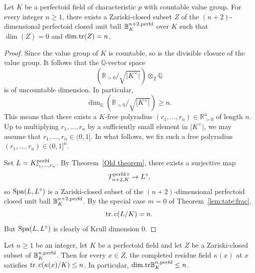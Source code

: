 \begin{thm}\label{Main theorem 2}Let $K$ be a perfectoid field of characteristic $p$ with countable value group. For every integer $n\geq1$, there exists a Zariski-closed subset $Z$ of the $(n+2)$-dimensional perfectoid closed unit ball $\mathbb{B}_{K}^{n+2,\operatorname{perfd}}$ over $K$ such that $\dim(Z)=0$ and $\mathrm{dim.tr}(Z)=n$.\end{thm}
\begin{proof}
Since the value group of $K$ is countable, so is the divisible closure of the value group. It follows that the $\mathbb{Q}$-vector space \begin{equation*}(\mathbb{R}_{>0}/\sqrt{\vert K^{\times}\vert})\otimes_{\mathbb{Z}}\mathbb{Q} \end{equation*}is of uncountable dimension. In particular, \begin{equation*}\dim_{\mathbb{Q}}(\mathbb{R}_{>0}/\sqrt{\vert K^{\times}\vert})\geq n.\end{equation*}This means that there exists a $K$-free polyradius $(r_1,\dots, r_n)\in \mathbb{R}_{>0}^{n}$ of length $n$. Up to multiplying $r_1,\dots, r_n$ by a sufficiently small element in $\vert K^{\times}\vert$, we may assume that $r_1,\dots, r_n\in (0, 1]$. In what follows, we fix such a free polyradius $(r_1,\dots, r_n)\in (0, 1]^{n}$. 

Set $L=K_{r_1,\dots, r_n}^{\operatorname{perfd}}$. By Theorem~\ref{Old theorem}, there exists a surjective map \begin{equation*}T_{n+2, K}^{\operatorname{perfd}\circ}\to L^{\circ},\end{equation*}so $\operatorname{Spa}(L, L^{\circ})$ is a Zariski-closed subset of the $(n+2)$-dimensional perfectoid closed unit ball $\mathbb{B}_{K}^{n+2,\operatorname{perfd}}$. By the special case $m=0$ of Theorem~\ref{lem:tate:frac}, \begin{equation*}\operatorname{tr.c}(L/K)=n.\end{equation*}But $\operatorname{Spa}(L, L^{\circ})$ is clearly of Krull dimension $0$. 
\end{proof}
\begin{lemma}\label{Trivial upper bound}Let $n\geq1$ be an integer, let $K$ be a perfectoid field and let $Z$ be a Zariski-closed subset of $\mathbb{B}_{K}^{n,\operatorname{perfd}}$. Then for every $x\in Z$, the completed residue field $\kappa(x)$ at $x$ satisfies $\operatorname{tr.c}(\kappa(x)/K)\leq n$. In particular, $\mathrm{dim.tr} \mathbb{B}_{K}^{n,\operatorname{perfd}}\leq n$. \end{lemma}
